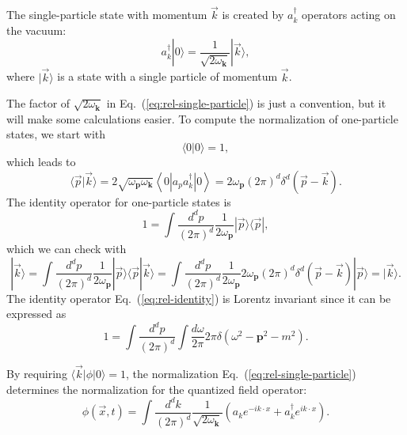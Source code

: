 The single-particle state with momentum $\vec k$ is created by $a_{k}^{\dagger}$ operators acting on the vacuum:
\begin{equation}
	a_{k}^{\dagger}|0\rangle =
	\frac{1}{\sqrt{2\omega_{\bm k}}}|\vec{k}\rangle,
	\label{eq:rel-single-particle}
\end{equation}
where $|\vec{k}\rangle$ is a state with a single particle of momentum $\vec{k}$.
\begin{framedrmk}
The factor of $\sqrt{2 \omega_{\bm k}}$ in Eq.~(\ref{eq:rel-single-particle}) is just a convention, but it will make some calculations easier. 
To compute the normalization of one-particle states, we start with
\begin{equation}
	\langle 0|0\rangle=1,
\end{equation}
which leads to
\begin{equation}
	\langle\vec{p}|\vec{k}\rangle 
	= 2\sqrt{\omega_{\bm p} \omega_{\bm k}}\left\langle 0\left|a_{p} a_{k}^{\dagger}\right| 0\right\rangle
	= 2 \omega_{\bm p}(2\pi)^{d} \delta^{d}(\vec{p}-\vec{k}).
\end{equation}
The identity operator for one-particle states is
\begin{equation}
	1=\int \frac{d^{d} p}{(2\pi)^{d}} \frac{1}{2\omega_{\bm p}}|\vec{p}\rangle\langle\vec{p}|, \label{eq:rel-identity}
\end{equation}
which we can check with
\begin{equation*}
	|\vec{k}\rangle
	=\int \frac{d^d p}{(2\pi)^d} \frac{1}{2\omega_{\bm p}}|\vec{p}\rangle\langle\vec{p}|\vec{k}\rangle
	=\int \frac{d^d p}{(2\pi)^d} \frac{1}{2\omega_{\bm p}} 2\omega_{\bm p}(2\pi)^d \delta^d(\vec{p}-\vec{k})|\vec{p}\rangle
	=|\vec{k}\rangle.
\end{equation*}
The identity operator Eq.~(\ref{eq:rel-identity}) is Lorentz invariant since it can be expressed as
\begin{equation}
	1 = \int \frac{d^{d} p}{(2\pi)^{d}} \int\frac{d\omega}{2\pi} 2\pi\delta(\omega^2-{\bm{p}}^2-m^2).
\end{equation}
\end{framedrmk}


By requiring $\langle \vec k|\phi|0\rangle = 1$, the normalization Eq.~(\ref{eq:rel-single-particle}) determines the normalization for the quantized field operator:
\begin{equation}
	\phi(\vec{x}, t)
	=\int \frac{d^d k}{(2\pi)^d} \frac{1}{\sqrt{2\omega_{\bm k}}}\left(a_k 
	e^{-i k \cdot x}+a_k^{\dagger} e^{i k \cdot x}\right).
\end{equation}

